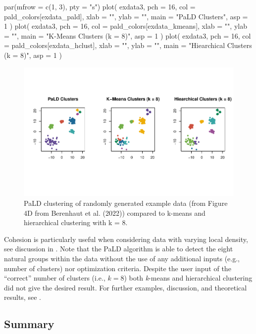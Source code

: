 \begin{Schunk}
\begin{Sinput}
par(mfrow = c(1, 3), pty = "s")
plot(
  exdata3,
  pch = 16,
  col = pald_colors[exdata_pald],
  xlab = "",
  ylab = "",
  main = "PaLD Clusters",
  asp = 1
)
plot(
  exdata3,
  pch = 16,
  col = pald_colors[exdata_kmeans],
  xlab = "",
  ylab = "",
  main = "K-Means Clusters (k = 8)",
  asp = 1
)
plot(
  exdata3,
  pch = 16,
  col = pald_colors[exdata_hclust],
  xlab = "",
  ylab = "",
  main = "Hiearchical Clusters (k = 8)",
  asp = 1
)
\end{Sinput}
\begin{figure}
\includegraphics{dagostino-mcgowan_files/figure-latex/fig5-1} \caption[PaLD clustering of randomly generated example data (from Figure 4D from Berenhaut et al]{PaLD clustering of randomly generated example data (from Figure 4D from Berenhaut et al. (2022)) compared to k-means and hierarchical clustering with k = 8.}\label{fig:fig5}
\end{figure}
\end{Schunk}

Cohesion is particularly useful when considering data with varying local
density, see discussion in \citet{berenhaut2022social}. Note that the
PaLD algorithm is able to detect the eight natural groups within the
data without the use of any additional inputs (e.g., number of clusters)
nor optimization criteria. Despite the user input of the ``correct''
number of clusters (i.e., \(k = 8\)) both \emph{k}-means and
hierarchical clustering did not give the desired result. For further
examples, discussion, and theoretical results, see
\citet{berenhaut2022social}.

\hypertarget{summary}{%
\subsection{Summary}\label{summary}}

